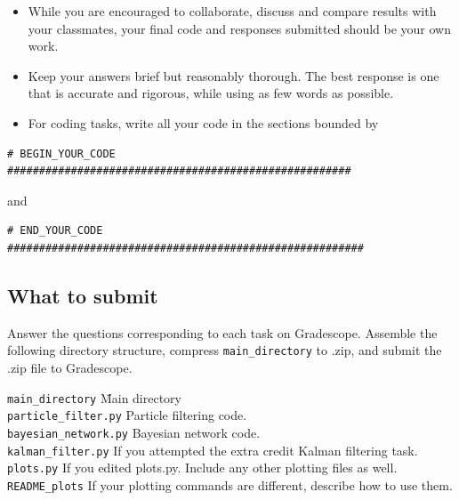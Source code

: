 \documentclass[a4paper]{article}
\begin{document}
\begin{itemize}
    \item While you are encouraged to collaborate, discuss and compare results with your classmates, your final code and responses submitted should be your own work.
    \item Keep your answers brief but reasonably thorough. The best response is one that is accurate and rigorous, while using as few words as possible.
    \item For coding tasks, write all your code in the sections bounded by
\end{itemize}

\begin{verbatim}
# BEGIN_YOUR_CODE ######################################################
\end{verbatim}
and
\begin{verbatim}
# END_YOUR_CODE ########################################################
\end{verbatim}

\subsection*{What to submit}

Answer the questions corresponding to each task on Gradescope. Assemble the following directory structure, compress \texttt{main\_directory} to .zip, and submit the .zip file to Gradescope.

\begin{tabbing}
    \texttt{main\_directory} \hspace{5em} \= Main directory \\
    \hspace{1em}\texttt{particle\_filter.py} \> Particle filtering code. \\
    \hspace{1em}\texttt{bayesian\_network.py} \> Bayesian network code.\\
    \hspace{1em}\texttt{kalman\_filter.py} \> If you attempted the extra credit Kalman filtering task.\\
    \hspace{1em}\texttt{plots.py} \> If you edited plots.py. Include any other plotting files as well.\\
    \hspace{1em}\texttt{README\_plots} \> If your plotting commands are different, describe how to use them.
\end{tabbing}
\end{document}
